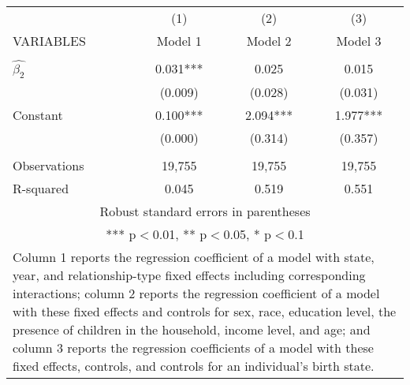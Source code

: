 \begin{tabular}{lccc}
\hline
 & (1) & (2) & (3) \\
VARIABLES & Model 1 & Model 2 & Model 3 \\ \hline
 &  &  &  \\
$\hat{\beta_2}$ & 0.031*** & 0.025 & 0.015 \\
 & (0.009) & (0.028) & (0.031) \\
Constant & 0.100*** & 2.094*** & 1.977*** \\
 & (0.000) & (0.314) & (0.357) \\
 &  &  &  \\
Observations & 19,755 & 19,755 & 19,755 \\
 R-squared & 0.045 & 0.519 & 0.551 \\ \hline
\multicolumn{4}{c}{ Robust standard errors in parentheses} \\
\multicolumn{4}{c}{ *** p$<$0.01, ** p$<$0.05, * p$<$0.1} \\
\multicolumn{4}{p{0.8\linewidth}}{\small Column 1 reports the regression coefficient of a model with state, year, and relationship-type fixed effects including corresponding interactions; column 2 reports the regression coefficient of a model with these fixed effects and controls for sex, race, education level, the presence of children in the household, income level, and age; and column 3 reports the regression coefficients of a model with these fixed effects, controls, and controls for an individual’s birth state.} \\
\end{tabular}

